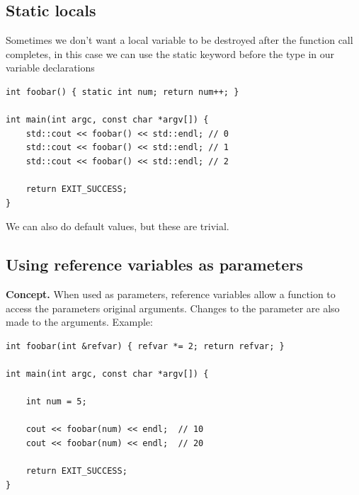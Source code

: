 \documentclass{report}
\begin{document}
    \pagebreak \bigbreak \noindent 
    \subsection{Static locals}
    \bigbreak \noindent 
    Sometimes we don't want a local variable to be destroyed after the function call completes, in this case we can use the static keyword before the type in our variable declarations
    \bigbreak \noindent 
    \sepline
    \begin{verbatim}
int foobar() { static int num; return num++; }

int main(int argc, const char *argv[]) {
    std::cout << foobar() << std::endl; // 0
    std::cout << foobar() << std::endl; // 1
    std::cout << foobar() << std::endl; // 2

    return EXIT_SUCCESS;
}
    \end{verbatim}
    \sepline

    \bigbreak \noindent 
    We can also do default values, but these are trivial.

    \bigbreak \noindent 
    \subsection{Using reference variables as parameters}
    \bigbreak \noindent 
    \textbf{Concept.} When used as parameters, reference variables allow a function to access the parameters original arguments. Changes to the parameter are also made to the arguments.
    \bigbreak \noindent 
    Example:
    \bigbreak \noindent 
    \sepline
    \begin{verbatim}
int foobar(int &refvar) { refvar *= 2; return refvar; }

int main(int argc, const char *argv[]) {
    
    int num = 5;

    cout << foobar(num) << endl;  // 10
    cout << foobar(num) << endl;  // 20

    return EXIT_SUCCESS;
}
    \end{verbatim}
    \sepline
    
    \bigbreak \noindent 
    \bigbreak \noindent 

    \pagebreak \bigbreak \noindent 
\end{document}

